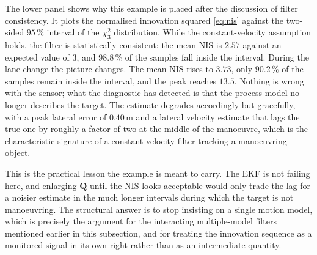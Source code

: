 \begin{example}
The lower panel shows why this example is placed after the discussion of filter
consistency. It plots the normalised innovation squared \eqref{eq:nis} against
the two-sided $95\,\%$ interval of the $\chi^{2}_{3}$ distribution. While the
constant-velocity assumption holds, the filter is statistically consistent: the
mean NIS is $2.57$ against an expected value of $3$, and $98.8\,\%$ of the
samples fall inside the interval. During the lane change the picture changes.
The mean NIS rises to $3.73$, only $90.2\,\%$ of the samples remain inside the
interval, and the peak reaches $13.5$. Nothing is wrong with the sensor; what
the diagnostic has detected is that the process model no longer describes the
target. The estimate degrades accordingly but gracefully, with a peak lateral
error of $0.40$\,m and a lateral velocity estimate that lags the true one by
roughly a factor of two at the middle of the manoeuvre, which is the
characteristic signature of a constant-velocity filter tracking a manoeuvring
object.

This is the practical lesson the example is meant to carry. The EKF is not
failing here, and enlarging $\mathbf{Q}$ until the NIS looks acceptable would
only trade the lag for a noisier estimate in the much longer intervals during
which the target is not manoeuvring. The structural answer is to stop insisting
on a single motion model, which is precisely the argument for the interacting
multiple-model filters mentioned earlier in this subsection, and for treating
the innovation sequence as a monitored signal in its own right rather than as an
intermediate quantity.
\end{example}

